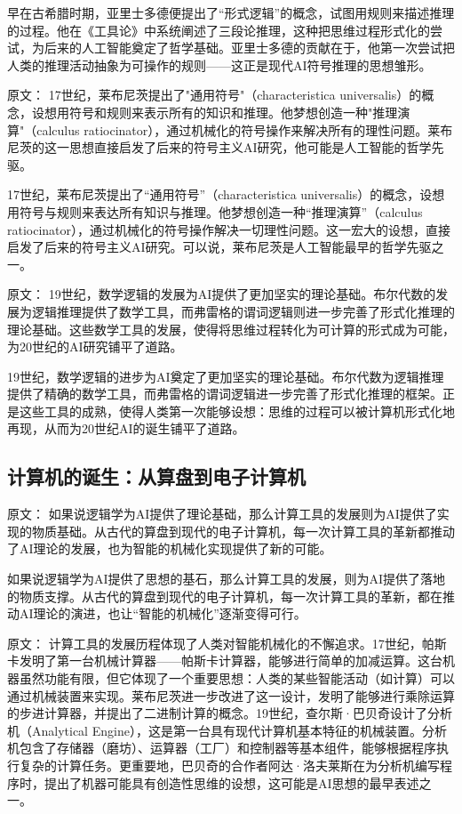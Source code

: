 早在古希腊时期，亚里士多德便提出了“形式逻辑”的概念，试图用规则来描述推理的过程。他在《工具论》中系统阐述了三段论推理，这种把思维过程形式化的尝试，为后来的人工智能奠定了哲学基础。亚里士多德的贡献在于，他第一次尝试把人类的推理活动抽象为可操作的规则——这正是现代AI符号推理的思想雏形。

原文：
17世纪，莱布尼茨提出了"通用符号"（characteristica universalis）的概念，设想用符号和规则来表示所有的知识和推理。他梦想创造一种"推理演算"（calculus ratiocinator），通过机械化的符号操作来解决所有的理性问题。莱布尼茨的这一思想直接启发了后来的符号主义AI研究，他可能是人工智能的哲学先驱。

17世纪，莱布尼茨提出了“通用符号”（characteristica universalis）的概念，设想用符号与规则来表达所有知识与推理。他梦想创造一种“推理演算”（calculus ratiocinator），通过机械化的符号操作解决一切理性问题。这一宏大的设想，直接启发了后来的符号主义AI研究。可以说，莱布尼茨是人工智能最早的哲学先驱之一。

原文：
19世纪，数学逻辑的发展为AI提供了更加坚实的理论基础。布尔代数的发展为逻辑推理提供了数学工具，而弗雷格的谓词逻辑则进一步完善了形式化推理的理论基础。这些数学工具的发展，使得将思维过程转化为可计算的形式成为可能，为20世纪的AI研究铺平了道路。

19世纪，数学逻辑的进步为AI奠定了更加坚实的理论基础。布尔代数为逻辑推理提供了精确的数学工具，而弗雷格的谓词逻辑进一步完善了形式化推理的框架。正是这些工具的成熟，使得人类第一次能够设想：思维的过程可以被计算机形式化地再现，从而为20世纪AI的诞生铺平了道路。

\subsection{计算机的诞生：从算盘到电子计算机}

原文：
如果说逻辑学为AI提供了理论基础，那么计算工具的发展则为AI提供了实现的物质基础。从古代的算盘到现代的电子计算机，每一次计算工具的革新都推动了AI理论的发展，也为智能的机械化实现提供了新的可能。

如果说逻辑学为AI提供了思想的基石，那么计算工具的发展，则为AI提供了落地的物质支撑。从古代的算盘到现代的电子计算机，每一次计算工具的革新，都在推动AI理论的演进，也让“智能的机械化”逐渐变得可行。

原文：
计算工具的发展历程体现了人类对智能机械化的不懈追求。17世纪，帕斯卡发明了第一台机械计算器——帕斯卡计算器，能够进行简单的加减运算。这台机器虽然功能有限，但它体现了一个重要思想：人类的某些智能活动（如计算）可以通过机械装置来实现。莱布尼茨进一步改进了这一设计，发明了能够进行乘除运算的步进计算器，并提出了二进制计算的概念。19世纪，查尔斯·巴贝奇设计了分析机（Analytical Engine），这是第一台具有现代计算机基本特征的机械装置。分析机包含了存储器（磨坊）、运算器（工厂）和控制器等基本组件，能够根据程序执行复杂的计算任务。更重要地，巴贝奇的合作者阿达·洛夫莱斯在为分析机编写程序时，提出了机器可能具有创造性思维的设想，这可能是AI思想的最早表述之一。

